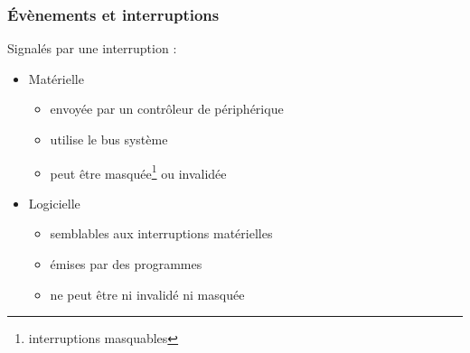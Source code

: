 \begin{frame}
\frametitle{Évènements et interruptions}
Signalés par une interruption :
\begin{itemize}
\item Matérielle
\begin{itemize}
\item envoyée par un contrôleur de périphérique
\item utilise le bus système
\item peut être masquée\footnote{interruptions masquables} ou invalidée
\end{itemize}
\item Logicielle
\begin{itemize}
\item semblables aux interruptions matérielles
\item émises par des programmes
\item ne peut être ni invalidé ni masquée
\end{itemize}
\end{itemize}
\end{frame}



